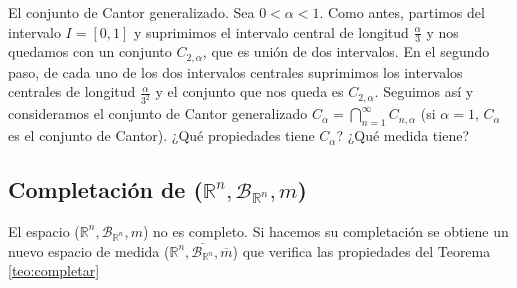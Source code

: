 \begin{ejemplo}
El conjunto de Cantor generalizado. Sea $0 < \alpha < 1$. Como antes, partimos del intervalo $I = [0, 1]$ y suprimimos el intervalo central de longitud $\frac{\alpha}{3}$ y nos quedamos con un conjunto $C_{2,\alpha}$, que es unión de dos intervalos. En el segundo paso, de cada uno de los dos intervalos centrales suprimimos los intervalos centrales de longitud $\frac{\alpha}{3^2}$ y el conjunto que nos queda es $C_{2,\alpha}$. Seguimos así y consideramos el conjunto de Cantor generalizado $C_{\alpha} = \bigcap_{n=1}^{\infty}{C_{n,\alpha}}$ (si $\alpha = 1$, $C_{\alpha}$ es el conjunto de Cantor). ¿Qué propiedades tiene $C_{\alpha}$? ¿Qué medida tiene?
\end{ejemplo}

\subsection{Completación de ($\mathbb{R}^n, \mathcal{B}_{\mathbb{R}^n}, m$)}
El espacio ($\mathbb{R}^n, \mathcal{B}_{\mathbb{R}^n}, m$) no es completo. Si hacemos su completación se obtiene un nuevo espacio de medida ($\mathbb{R}^n, \overline{\mathcal{B}_{\mathbb{R}^n}}, \overline{m}$) que verifica las propiedades del Teorema \ref{teo:completar}
